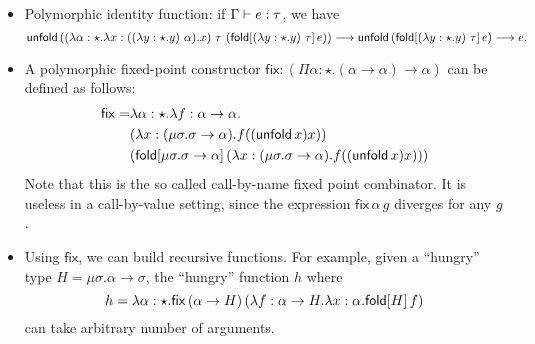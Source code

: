 \begin{itemize}
  \newcommand{\FPTypeU}{\mu\sigma . \sigma \to \alpha}
  \newcommand{\FPTermfxx}{\lambda x:(\FPTypeU).f((\unfold{x})x)}
  \newcommand{\FP}{\mathsf{fix}} %
\item Polymorphic identity function: if $\Gamma \vdash e:\tau$, we have
  \[\mathsf{unfold}\,((\lambda \alpha:\star.\lambda x:((\lambda y:\star.y)~\alpha).x)~\tau~(\mathsf{fold}[(\lambda y:\star.y)~\tau]\,e)) \longrightarrow \mathsf{unfold}\,(\mathsf{fold}[(\lambda y:\star.y)~\tau]\,e) \longrightarrow e.\]
\item A polymorphic fixed-point constructor
  $\FP:(\Pi \alpha:\star.(\alpha \to \alpha) \to \alpha)$ can be
  defined as follows:
  \begin{align*}
    \FP=&\lambda \alpha:\star . \lambda f:\alpha \to \alpha.\\
        &(\FPTermfxx)\\
        &(\fold{\FPTypeU}{(\FPTermfxx)})
  \end{align*}
  Note that this is the so called call-by-name fixed point
  combinator. It is useless in a call-by-value setting, since the
  expression $\FP\,\alpha\,g$ diverges for any $g$.
  \newcommand{\HGType}{\mu\sigma. \alpha \to \sigma}%
\item Using $\FP$, we can build recursive functions. For example,
  given a ``hungry'' type $H=\HGType$, the ``hungry'' function $h$
  where
  \[h=\lambda \alpha:\star.\FP\,(\alpha \to H)\,(\lambda f:\alpha \to
  H.\lambda x:\alpha.\fold{H}{f})\]
  can take arbitrary number of arguments.
\end{itemize}
